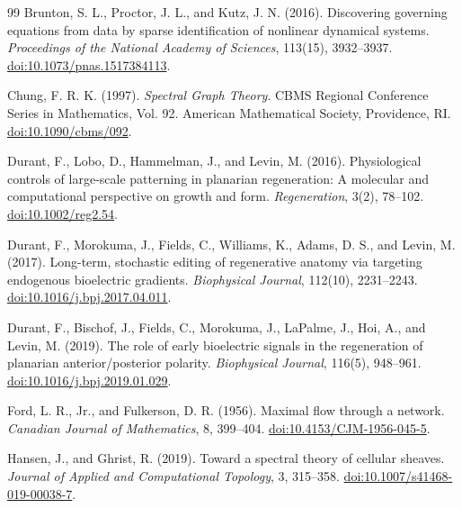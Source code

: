 \documentclass[12pt,a4paper]{article}
\begin{document}
\begin{thebibliography}{99}
\footnotesize
\setlength{\itemsep}{1pt}
\setlength{\parskip}{0pt}
Brunton, S. L., Proctor, J. L., and Kutz, J. N. (2016).
Discovering governing equations from data by sparse identification of nonlinear dynamical systems.
\emph{Proceedings of the National Academy of Sciences}, 113(15), 3932--3937.
\href{https://doi.org/10.1073/pnas.1517384113}{doi:10.1073/pnas.1517384113}.

Chung, F. R. K. (1997). \emph{Spectral Graph Theory}.
CBMS Regional Conference Series in Mathematics, Vol. 92.
American Mathematical Society, Providence, RI.
\href{https://doi.org/10.1090/cbms/092}{doi:10.1090/cbms/092}.

Durant, F., Lobo, D., Hammelman, J., and Levin, M. (2016).
Physiological controls of large-scale patterning in planarian regeneration: A molecular and computational perspective on growth and form.
\emph{Regeneration}, 3(2), 78--102.
\href{https://doi.org/10.1002/reg2.54}{doi:10.1002/reg2.54}.

Durant, F., Morokuma, J., Fields, C., Williams, K., Adams, D. S., and Levin, M. (2017).
Long-term, stochastic editing of regenerative anatomy via targeting endogenous bioelectric gradients.
\emph{Biophysical Journal}, 112(10), 2231--2243.
\href{https://doi.org/10.1016/j.bpj.2017.04.011}{doi:10.1016/j.bpj.2017.04.011}.

Durant, F., Bischof, J., Fields, C., Morokuma, J., LaPalme, J., Hoi, A., and Levin, M. (2019).
The role of early bioelectric signals in the regeneration of planarian anterior/posterior polarity.
\emph{Biophysical Journal}, 116(5), 948--961.
\href{https://doi.org/10.1016/j.bpj.2019.01.029}{doi:10.1016/j.bpj.2019.01.029}.

Ford, L. R., Jr., and Fulkerson, D. R. (1956).
Maximal flow through a network.
\emph{Canadian Journal of Mathematics}, 8, 399--404.
\href{https://doi.org/10.4153/CJM-1956-045-5}{doi:10.4153/CJM-1956-045-5}.

Hansen, J., and Ghrist, R. (2019).
Toward a spectral theory of cellular sheaves.
\emph{Journal of Applied and Computational Topology}, 3, 315--358.
\href{https://doi.org/10.1007/s41468-019-00038-7}{doi:10.1007/s41468-019-00038-7}.


\end{thebibliography}
\end{document}

